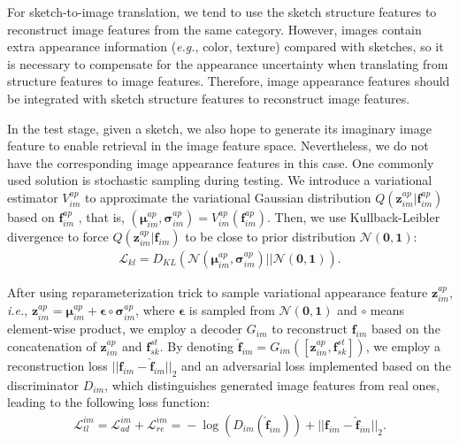 \documentclass[10pt,twocolumn,letterpaper]{article}
\begin{document}
For sketch-to-image translation, we tend to use the sketch structure features to reconstruct image features from the same category. 
However, images contain extra appearance information (\emph{e.g.}, color, texture) compared with sketches, so it is necessary to compensate for the appearance uncertainty when translating from structure features to image features. 
Therefore, image appearance features should be integrated with sketch structure features to reconstruct image features. 

In the test stage, given a sketch, we also hope to generate its imaginary image feature to enable retrieval in the image feature space. Nevertheless, we do not have the corresponding image appearance features in this case. One commonly used solution is stochastic sampling during testing. We introduce a variational estimator $V_{im}^{ap}$ to approximate the variational Gaussian distribution $Q(\mathbf{z}_{im}^{ap}|\mathbf{f}_{im}^{ap})$ based on $\mathbf{f}_{im}^{ap}$ , that is, $(\bm{\mu}_{im}^{ap}, \bm{\sigma}_{im}^{ap})= V_{im}^{ap}(\mathbf{f}_{im}^{ap})$. Then, we use Kullback-Leibler divergence to force  $Q(\mathbf{z}_{im}^{ap}|\mathbf{f}_{im})$ to be close to prior distribution $\mathcal{N}(\mathbf{0}, \mathbf{1})$:
\vspace{-4pt}
\begin{align}
    \mathcal{L}_{kl} = D_{KL}(\mathcal{N}(\bm{\mu}_{im}^{ap}, \bm{\sigma}_{im}^{ap}) || \mathcal{N}(\mathbf{0}, \mathbf{1})).
\end{align}

After using reparameterization trick \cite{kingma2013auto} to sample variational appearance feature  $\mathbf{z}_{im}^{ap}$, \emph{i.e.}, $\mathbf{z}_{im}^{ap}=\bm{\mu}_{im}^{ap}+\bm{\epsilon}\circ \bm{\sigma}_{im}^{ap}$, where $\bm{\epsilon}$ is sampled from $\mathcal{N}(\mathbf{0}, \mathbf{1})$ and $\circ$ means element-wise product, we employ a decoder $G_{im}$ to reconstruct $\mathbf{f}_{im}$ based on the concatenation of $\mathbf{z}_{im}^{ap}$ and $\mathbf{f}_{sk}^{st}$.  
By denoting $\hat{\mathbf{f}}_{im} = G_{im}([\mathbf{z}_{im}^{ap}, \mathbf{f}_{sk}^{st}])$, we employ a reconstruction loss $||\mathbf{f}_{im}\!-\!\hat{\mathbf{f}}_{im}||_2$ and an adversarial loss implemented based on the discriminator $D_{im}$, which distinguishes generated image features from real ones, leading to the following loss function:
\vspace{-4pt}
\begin{align} \label{eqn:7}
    \mathcal{L}_{tl}^{im}\!=\!\mathcal{L}_{ad}^{im}\!+\!\mathcal{L}_{re}^{im} \!=\!-\!\log(D_{im}(\hat{\mathbf{f}}_{im})) \!+\! ||\mathbf{f}_{im}\!-\!\hat{\mathbf{f}}_{im}||_2.
\end{align}
\end{document}
